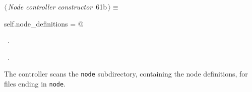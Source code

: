 \documentclass[
    a4paper,      %
    10pt,         %
    openright,    %
    notitlepage,  %
    parskip=half, %
]{scrreprt}       %
\theoremstyle{definition}                    %
\begin{document}
\begin{flushleft} \small
\begin{minipage}{\linewidth}\label{scrap104}\raggedright\small
{} $\langle\,${\itshape Node controller constructor}\nobreak\ {\footnotesize {61b}}$\,\rangle\equiv$
\vspace{-1ex}
\begin{list}{}{} \item
\mbox{}\lstinline@    self.node_definitions = {}@{\NWsep}
\end{list}
\vspace{-1.5ex}
\footnotesize
\begin{list}{}{\setlength{\itemsep}{-\parsep}\setlength{\itemindent}{-\leftmargin}}
\item \NWtxtMacroDefBy\ .
\item \NWtxtMacroRefIn\ .

\item{}
\end{list}
\end{minipage}\vspace{4ex}
\end{flushleft}
The controller scans the \verb+node+ subdirectory, containing the node
definitions, for files ending in \verb+node+.
\end{document}
